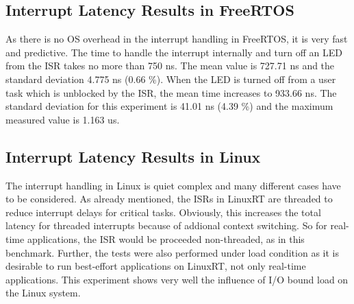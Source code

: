 \subsection{Interrupt Latency Results in FreeRTOS}
As there is no \ac{OS} overhead in the interrupt handling in FreeRTOS, it is very fast and predictive.
The time to handle the interrupt internally and turn off an \ac{LED} from the \ac{ISR} takes no more than 750 ns. 
The mean value is 727.71 ns and the standard deviation 4.775 ns (0.66 \%). 
When the \ac{LED} is turned off from a user task which is unblocked by the \ac{ISR}, the mean time increases to 933.66 ns.
The standard deviation for this experiment is 41.01 ns (4.39 \%) and the maximum measured value is 1.163 us.
  

\subsection{Interrupt Latency Results in Linux}\label{ss_interrupt_latency_results_in_linux}
The interrupt handling in Linux is quiet complex and many different cases have to be considered. 
As already mentioned, the \acp{ISR} in LinuxRT are threaded to reduce interrupt delays for critical tasks. 
Obviously, this increases the total latency for threaded interrupts because of addional context switching.
So for real-time applications, the \ac{ISR} would be proceeded non-threaded, as in this benchmark.
Further, the tests were also performed under load condition as it is desirable to run best-effort applications on LinuxRT, not only real-time applications. 
This experiment shows very well the influence of \ac{I/O} bound load on the Linux system.

